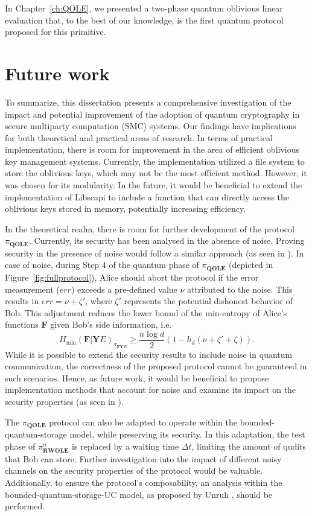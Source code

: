In Chapter~\ref{ch:QOLE}, we presented a two-phase quantum oblivious linear evaluation that, to the best of our knowledge, is the first quantum protocol proposed for this primitive.

\section{Future work}

To summarize, this dissertation presents a comprehensive investigation of the impact and potential improvement of the adoption of quantum cryptography in secure multiparty computation (SMC) systems. Our findings have implications for both theoretical and practical areas of research. In terms of practical implementation, there is room for improvement in the area of efficient oblivious key management systems. Currently, the implementation utilized a file system to store the oblivious keys, which may not be the most efficient method. However, it was chosen for its modularity. In the future, it would be beneficial to extend the implementation of Libscapi to include a function that can directly access the oblivious keys stored in memory, potentially increasing efficiency.

In the theoretical realm, there is room for further development of the protocol $\pi_{\textbf{QOLE}}$. Currently, its security has been analysed in the absence of noise. Proving security in the presence of noise would follow a similar approach (as seen in \cite{DFLSS09}). In case of noise, during Step 4 of the quantum phase of $\pi_{\textbf{QOLE}}$ (depicted in Figure~\ref{fig:fullprotocol}), Alice should abort the protocol if the error measurement ($err$) exceeds a pre-defined value $\nu$ attributed to the noise. This results in $err = \nu + \zeta '$, where $\zeta '$ represents the potential dishonest behavior of Bob. This adjustment reduces the lower bound of the min-entropy of Alice's functions $\mathbf{F}$ given Bob's side information, i.e.
$$H_{\min}(\mathbf{F} | \mathbf{Y} E)_{\sigma_{\mathbf{F}\mathbf{Y} E}} \geq \frac{n\log d}{2}\left(1 - h_d(\nu + \zeta ' + \zeta)\right).$$
While it is possible to extend the security results to include noise in quantum communication, the correctness of the proposed protocol cannot be guaranteed in such scenarios. Hence, as future work, it would be beneficial to propose implementation methods that account for noise and examine its impact on the security properties (as seen in \cite{BCDP21}).


The $\pi_{\textbf{QOLE}}$ protocol can also be adapted to operate within the bounded-quantum-storage model, while preserving its security. In this adaptation, the test phase of $\pi^n_{\textbf{RWOLE}}$ is replaced by a waiting time $\Delta t$, limiting the amount of qudits that Bob can store. Further investigation into the impact of different noisy channels on the security properties of the protocol would be valuable. Additionally, to ensure the protocol's composability, an analysis within the bounded-quantum-storage-UC model, as proposed by Unruh \cite{U11}, should be performed.

